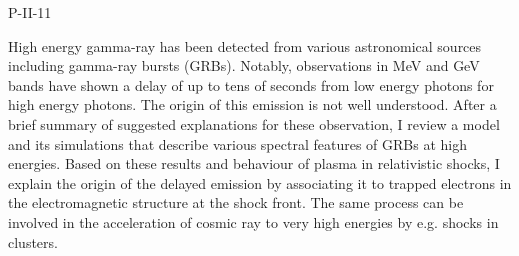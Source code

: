 P-II-11


\bigskip



\bigskip

\noindent High energy gamma-ray has been detected from various astronomical sources including gamma-ray bursts (GRBs). Notably, observations in MeV and GeV bands have shown a delay of up to tens of seconds from low energy photons for high energy photons. The origin of this emission is not well understood. After a brief summary of suggested explanations for these observation, I review a model and its simulations that describe various spectral features of GRBs at high energies. Based on these results and behaviour of plasma in relativistic shocks, I explain the origin of the delayed emission by associating it to trapped electrons in the electromagnetic structure at the shock front. The same process can be involved in the acceleration of cosmic ray to very high energies by e.g. shocks in clusters.

